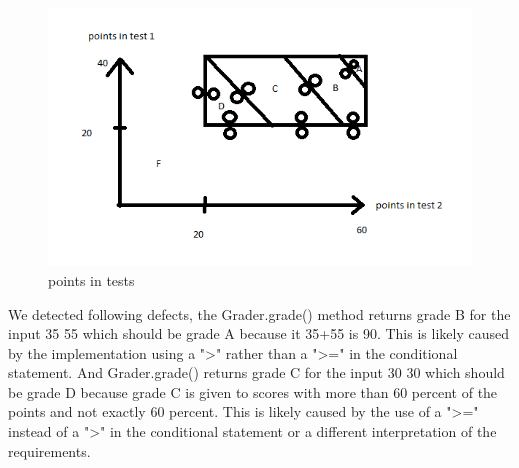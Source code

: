 \begin{parlist}
\begin{figure}[hbt]
  \centering\includegraphics{Immagini/diagram.png}
  \caption{points in tests}
\end{figure}





\item We detected following defects, the Grader.grade() method returns grade B for the input 35 55 which should be grade A because it 35+55 is 90. This is likely caused by the implementation using a ">" rather than a ">=" in the conditional statement. And Grader.grade() returns grade C for the input 30 30 which should be grade D because grade C is given to scores with more than 60 percent of the points and not exactly 60 percent. This is likely caused by the use of a ">=" instead of a ">" in the conditional statement or a different interpretation of the requirements.

\end{parlist}

